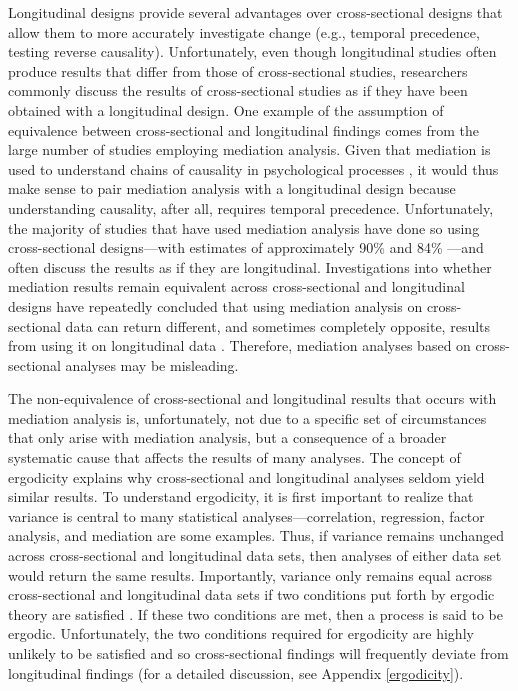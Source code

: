 \documentclass[
12pt, %
twoside,
english]{guelphthesis}
\begin{document}
Longitudinal designs provide several advantages over cross-sectional designs that allow them to more accurately investigate change (e.g., temporal precedence, testing reverse causality). Unfortunately, even though longitudinal studies often produce results that differ from those of cross-sectional studies, researchers commonly discuss the results of cross-sectional studies as if they have been obtained with a longitudinal design. One example of the assumption of equivalence between cross-sectional and longitudinal findings comes from the large number of studies employing mediation analysis. Given that mediation is used to understand chains of causality in psychological processes \autocite{baron1986}, it would thus make sense to pair mediation analysis with a longitudinal design because understanding causality, after all, requires temporal precedence. Unfortunately, the majority of studies that have used mediation analysis have done so using cross-sectional designs---with estimates of approximately 90\% \autocite{maxwell2007} and 84\% \autocite{mitchell2013}---and often discuss the results as if they are longitudinal. Investigations into whether mediation results remain equivalent across cross-sectional and longitudinal designs have repeatedly concluded that using mediation analysis on cross-sectional data can return different, and sometimes completely opposite, results from using it on longitudinal data \autocite{cole2003,maxwell2007,maxwell2011,mitchell2013,olaughlin2018}. Therefore, mediation analyses based on cross-sectional analyses may be misleading.

The non-equivalence of cross-sectional and longitudinal results that occurs with mediation analysis is, unfortunately, not due to a specific set of circumstances that only arise with mediation analysis, but a consequence of a broader systematic cause that affects the results of many analyses. The concept of ergodicity explains why cross-sectional and longitudinal analyses seldom yield similar results. To understand ergodicity, it is first important to realize that variance is central to many statistical analyses---correlation, regression, factor analysis, and mediation are some examples. Thus, if variance remains unchanged across cross-sectional and longitudinal data sets, then analyses of either data set would return the same results. Importantly, variance only remains equal across cross-sectional and longitudinal data sets if two conditions put forth by ergodic theory are satisfied \autocites[homogeneity and stationarity;][]{molenaar2004,molenaar2009}. If these two conditions are met, then a process is said to be ergodic. Unfortunately, the two conditions required for ergodicity are highly unlikely to be satisfied and so cross-sectional findings will frequently deviate from longitudinal findings (for a detailed discussion, see Appendix \ref{ergodicity}).
\end{document}
